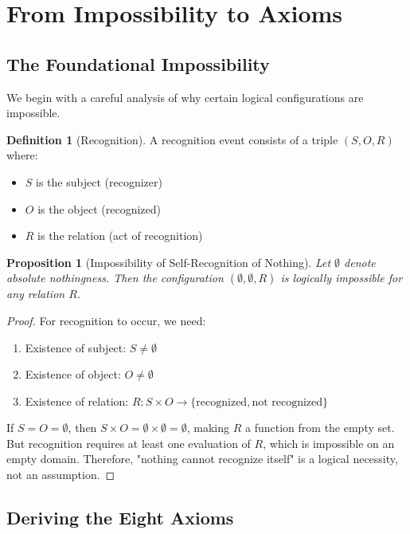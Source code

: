 \documentclass[12pt]{article}
\newtheorem{proposition}[theorem]{Proposition}
\theoremstyle{definition}
\newtheorem{definition}[theorem]{Definition}
\theoremstyle{remark}
\begin{document}
\section{From Impossibility to Axioms}

\subsection{The Foundational Impossibility}

We begin with a careful analysis of why certain logical configurations are impossible.

\begin{definition}[Recognition]
A recognition event consists of a triple $(S, O, R)$ where:
\begin{itemize}
\item $S$ is the subject (recognizer)
\item $O$ is the object (recognized)
\item $R$ is the relation (act of recognition)
\end{itemize}
\end{definition}

\begin{proposition}[Impossibility of Self-Recognition of Nothing]
Let $\emptyset$ denote absolute nothingness. Then the configuration $(\emptyset, \emptyset, R)$ is logically impossible for any relation $R$.
\end{proposition}

\begin{proof}
For recognition to occur, we need:
\begin{enumerate}
\item Existence of subject: $S \neq \emptyset$
\item Existence of object: $O \neq \emptyset$
\item Existence of relation: $R: S \times O \to \{\text{recognized}, \text{not recognized}\}$
\end{enumerate}

If $S = O = \emptyset$, then $S \times O = \emptyset \times \emptyset = \emptyset$, making $R$ a function from the empty set. But recognition requires at least one evaluation of $R$, which is impossible on an empty domain. Therefore, "nothing cannot recognize itself" is a logical necessity, not an assumption.
\end{proof}

\subsection{Deriving the Eight Axioms}
\end{document}
